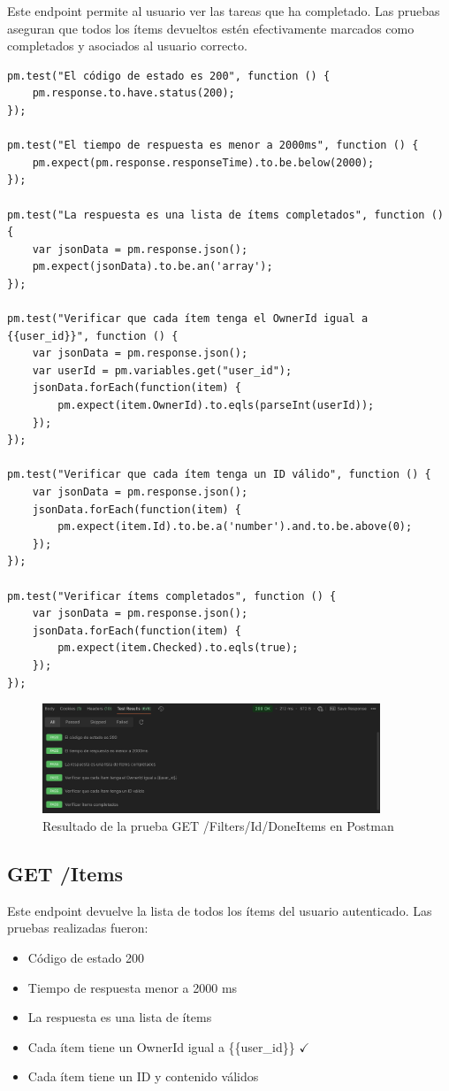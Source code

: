 \documentclass{report}
\begin{document}
Este endpoint permite al usuario ver las tareas que ha completado. Las pruebas aseguran que todos los ítems devueltos estén efectivamente marcados como completados y asociados al usuario correcto.

\begin{lstlisting}
pm.test("El código de estado es 200", function () {
    pm.response.to.have.status(200);
});

pm.test("El tiempo de respuesta es menor a 2000ms", function () {
    pm.expect(pm.response.responseTime).to.be.below(2000);
});

pm.test("La respuesta es una lista de ítems completados", function () {
    var jsonData = pm.response.json();
    pm.expect(jsonData).to.be.an('array');
});

pm.test("Verificar que cada ítem tenga el OwnerId igual a {{user_id}}", function () {
    var jsonData = pm.response.json();
    var userId = pm.variables.get("user_id");
    jsonData.forEach(function(item) {
        pm.expect(item.OwnerId).to.eqls(parseInt(userId));
    });
});

pm.test("Verificar que cada ítem tenga un ID válido", function () {
    var jsonData = pm.response.json();
    jsonData.forEach(function(item) {
        pm.expect(item.Id).to.be.a('number').and.to.be.above(0);
    });
});

pm.test("Verificar ítems completados", function () {
    var jsonData = pm.response.json();
    jsonData.forEach(function(item) {
        pm.expect(item.Checked).to.eqls(true);
    });
});
\end{lstlisting}

\begin{figure}[h!]
    \centering
    \includegraphics[width=0.9\textwidth]{./imgs/tc3postman.png}
    \caption{Resultado de la prueba GET /Filters/Id/DoneItems en Postman}
    \label{fig:tc2postman}
\end{figure}

\subsection{GET /Items}
Este endpoint devuelve la lista de todos los ítems del usuario autenticado. Las pruebas realizadas fueron:
\begin{itemize}
    \item Código de estado 200 \checkmark
    \item Tiempo de respuesta menor a 2000 ms \checkmark
    \item La respuesta es una lista de ítems \checkmark
    \item Cada ítem tiene un OwnerId igual a \{\{user\_id\}\} $\checkmark$
    \item Cada ítem tiene un ID y contenido válidos \checkmark
\end{itemize}
\end{document}
